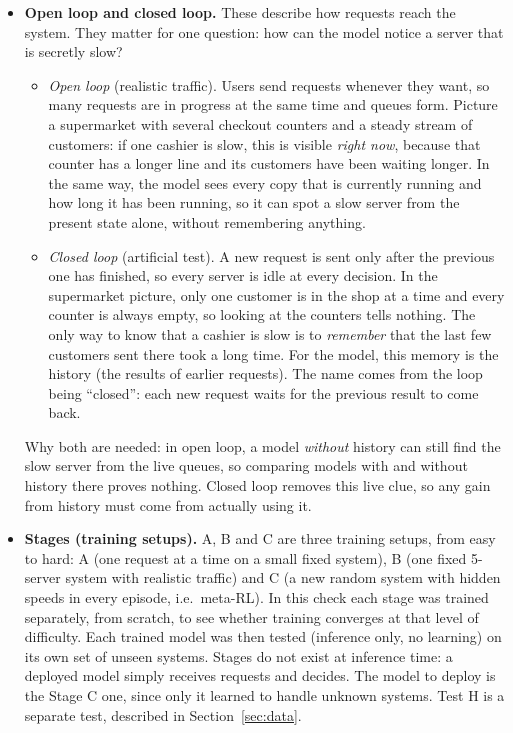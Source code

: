 \documentclass[10pt,a4paper]{article}
\begin{document}
\begin{itemize}
\item \textbf{Open loop and closed loop.} These describe how requests reach the system. They matter for one question: how can the model notice a server that is secretly slow?
\begin{itemize}
\item \emph{Open loop} (realistic traffic). Users send requests whenever they want, so many requests are in progress at the same time and queues form. Picture a supermarket with several checkout counters and a steady stream of customers: if one cashier is slow, this is visible \emph{right now}, because that counter has a longer line and its customers have been waiting longer. In the same way, the model sees every copy that is currently running and how long it has been running, so it can spot a slow server from the present state alone, without remembering anything.
\item \emph{Closed loop} (artificial test). A new request is sent only after the previous one has finished, so every server is idle at every decision. In the supermarket picture, only one customer is in the shop at a time and every counter is always empty, so looking at the counters tells nothing. The only way to know that a cashier is slow is to \emph{remember} that the last few customers sent there took a long time. For the model, this memory is the history (the results of earlier requests). The name comes from the loop being ``closed'': each new request waits for the previous result to come back.
\end{itemize}
Why both are needed: in open loop, a model \emph{without} history can still find the slow server from the live queues, so comparing models with and without history there proves nothing. Closed loop removes this live clue, so any gain from history must come from actually using it.
\item \textbf{Stages (training setups).} A, B and C are three training setups, from easy to hard: A (one request at a time on a small fixed system), B (one fixed 5-server system with realistic traffic) and C (a new random system with hidden speeds in every episode, i.e.\ meta-RL). In this check each stage was trained separately, from scratch, to see whether training converges at that level of difficulty. Each trained model was then tested (inference only, no learning) on its own set of unseen systems. Stages do not exist at inference time: a deployed model simply receives requests and decides. The model to deploy is the Stage C one, since only it learned to handle unknown systems. Test H is a separate test, described in Section~\ref{sec:data}.
\end{itemize}
\end{document}
